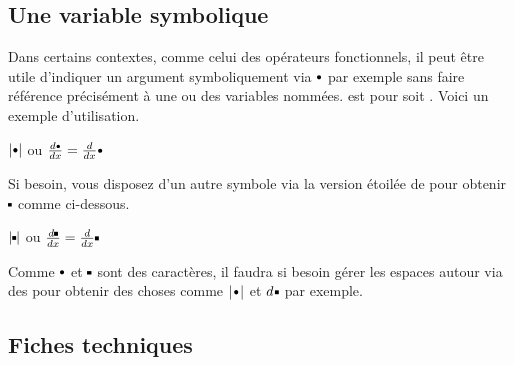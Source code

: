 \documentclass[12pt,a4paper]{article}
\begin{document}

\subsection{Une variable \og symbolique \fg{}}


Dans certains contextes, comme celui des opérateurs fonctionnels, il peut être utile d'indiquer un argument symboliquement via $\symvar$ par exemple sans faire référence précisément à une ou des variables nommées.
 est pour   soit .
Voici un exemple d'utilisation.

\begin{latexex}
 $| \symvar |$ ou
 $\frac{d\symvar}{dx}
= \frac{d}{dx}\symvar$
\end{latexex}


Si besoin, vous disposez d'un autre symbole via la version étoilée de  pour obtenir $\symvar*$ comme ci-dessous.

\begin{latexex}
 $| \symvar* |$ ou
 $\frac{d\symvar*}{dx}
= \frac{d}{dx}\symvar*$
\end{latexex}

\begin{remark}
	Comme $\symvar$ et $\symvar*$ sont des caractères, il faudra si besoin gérer les espaces autour via des  pour obtenir des choses comme  $|\kern.2ex\symvar\kern.2ex|$ et  $d\kern.25ex\symvar*$ par exemple.
\end{remark}





\subsection{Fiches techniques}


\end{document}
